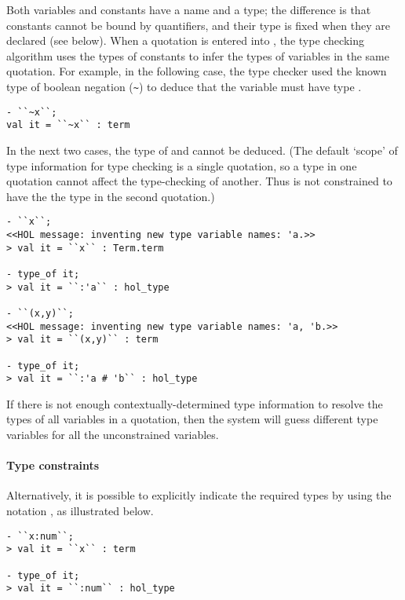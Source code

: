 Both variables and constants have a name and a type; the difference is
that constants cannot be bound by quantifiers, and their type is fixed
when they are declared (see below). When a quotation is entered into
\HOL{}, the type checking algorithm uses the types of constants to
infer the types of variables in the same quotation. For example,
in the following case, the \HOL{} type checker used the known type
 of boolean negation ({\small\verb|~|}) to deduce that
the variable  must have type .

\begin{session}\begin{verbatim}
- ``~x``;
val it = ``~x`` : term
\end{verbatim}\end{session}

In the next two cases, the type of  and  cannot be
deduced.  (The default `scope' of type information for type checking
is a single quotation, so a type in one quotation cannot affect the
type-checking of another. Thus  is not constrained to have the
the type  in the second quotation.)

\begin{session}\begin{verbatim}
- ``x``;
<<HOL message: inventing new type variable names: 'a.>>
> val it = ``x`` : Term.term

- type_of it;
> val it = ``:'a`` : hol_type

- ``(x,y)``;
<<HOL message: inventing new type variable names: 'a, 'b.>>
> val it = ``(x,y)`` : term

- type_of it;
> val it = ``:'a # 'b`` : hol_type
\end{verbatim}\end{session}

If there is not enough contextually-determined type information to
resolve the types of all variables in a quotation, then the system
will guess different type variables for all the unconstrained
variables.

\paragraph{Type constraints}

Alternatively, it is possible to explicitly indicate the required
types by using the notation , as illustrated below.

\begin{session}\begin{verbatim}
- ``x:num``;
> val it = ``x`` : term

- type_of it;
> val it = ``:num`` : hol_type
\end{verbatim}\end{session}

